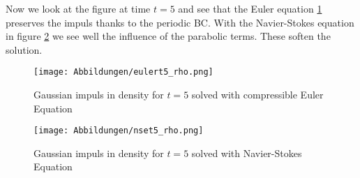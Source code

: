 \documentclass[11pt]{scrartcl}
\begin{document}
 Now we look at the figure at time $t = 5$ and see that the Euler equation \ref{gaus_euler_t5} preserves the impuls thanks to the periodic BC. With the Navier-Stokes equation in figure \ref{gaus_nse_t5} we see well the influence of the parabolic terms. These soften the solution.
 
 \begin{figure}[H]
 	\centering
 	\texttt{[image: Abbildungen/eulert5\_rho.png]}
 	\caption{Gaussian impuls in density for $t=5$ solved with compressible Euler Equation}
 	\label{gaus_euler_t5}
 \end{figure}

 \begin{figure}[H]
	\centering
	\texttt{[image: Abbildungen/nset5\_rho.png]}
	\caption{Gaussian impuls in density for $t=5$ solved with Navier-Stokes Equation}
	\label{gaus_nse_t5}
\end{figure}

\newpage
{}


\end{document}
